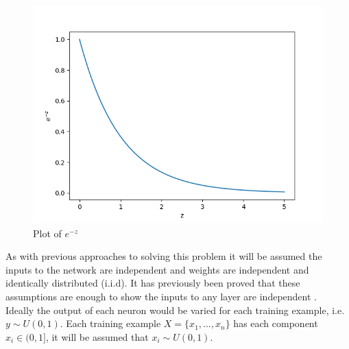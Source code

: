 \begin{minipage}[t]{0.4\textwidth}
\vspace{0px}
\begin{figure}[H]
\vspace{0px}
    \includegraphics[width=\textwidth]{activation-plot.png}
    \caption{Plot of $e^{-z}$}
    \label{fig:activation-plot}
\end{figure}
\end{minipage}

As with previous approaches to solving this problem it will be assumed the inputs to the network are independent and weights are independent and identically distributed (i.i.d). It has previously been proved that these assumptions are enough to show the inputs to any layer are independent \cite{kumar2017weight}.\\

Ideally the output of each neuron would be varied for each training example, i.e. $y \sim U(0,1)$. Each training example $X = \{x_1, ..., x_n\}$ has each component $x_i \in (0,1]$, it will be assumed that $x_i \sim U(0,1)$. 

